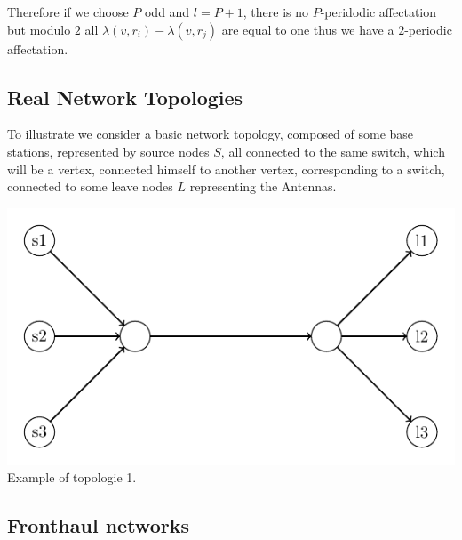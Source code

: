 \documentclass{article}
\begin{document}
Therefore if we choose $P$ odd and $l=P+1$, there is no $P$-peridodic affectation but modulo $2$ all $\lambda(v,r_i) - \lambda(v,r_j)$
are equal to one thus we have a $2$-periodic affectation. 
 


\subsection{Real Network Topologies}

To illustrate we consider a basic network topology, composed of some base stations, represented by source nodes $S$, all connected to the same switch,
which will be a vertex, connected himself to another vertex, corresponding to a switch, connected to some leave nodes $L$ representing the Antennas.

\begin{center}
 
\includegraphics[scale=1]{Fig4.pdf}\\
Example of topologie 1.
\end{center}


\subsection{Fronthaul networks}
\end{document}
